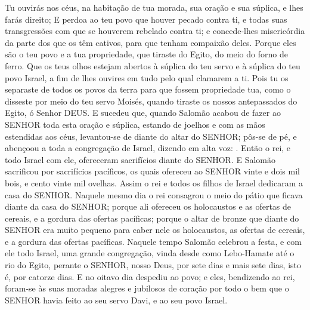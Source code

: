 {{  Tu ouvirás nos céus, na habitação de tua morada, sua oração e sua súplica, e lhes farás direito;
  E perdoa ao teu povo que houver pecado contra ti, e todas suas transgressões com que se houverem rebelado contra ti; e concede-lhes misericórdia da parte dos que os têm cativos, para que tenham compaixão deles. %
  Porque eles são o teu povo e a tua propriedade, que tiraste do Egito, do meio do forno de ferro.
  Que os teus olhos estejam abertos à súplica do teu servo e à súplica do teu povo Israel, a fim de lhes ouvires em tudo pelo qual clamarem a ti. %
  Pois tu os separaste de todos os povos da terra para que fossem propriedade tua, como o disseste por meio do teu servo Moisés, quando tiraste os nossos antepassados do Egito, ó Senhor DEUS}.
  E sucedeu que, quando Salomão acabou de fazer ao SENHOR toda esta oração e súplica, estando de joelhos e com as mãos estendidas aos céus, levantou-se de diante do altar do SENHOR;
  pôs-se de pé, e abençoou a toda a congregação de Israel, dizendo em alta voz:
  .
  Então o rei, e todo Israel com ele, ofereceram sacrifícios diante do SENHOR.
  E Salomão sacrificou por sacrifícios pacíficos, os quais ofereceu ao SENHOR vinte e dois mil bois, e cento vinte mil ovelhas. Assim o rei e todos os filhos de Israel dedicaram a casa do SENHOR.
  Naquele mesmo dia o rei consagrou o meio do pátio que ficava diante da casa do SENHOR; porque ali ofereceu os holocaustos e as ofertas de cereais, e a gordura das ofertas pacíficas; porque o altar de bronze que
{} diante do SENHOR era muito pequeno para caber nele os holocaustos, as ofertas de cereais, e a gordura das ofertas pacíficas.
  Naquele tempo Salomão celebrou a festa, e com ele todo Israel, uma grande congregação, vinda desde como Lebo-Hamate até o rio do Egito, perante o SENHOR, nosso Deus, por sete dias e mais sete dias, isto é, por catorze dias.
  E no oitavo dia despediu ao povo; e eles, bendizendo ao rei, foram-se às suas moradas alegres e jubilosos de coração por todo o bem que o SENHOR havia feito ao seu servo Davi, e ao seu povo Israel.
\par }

